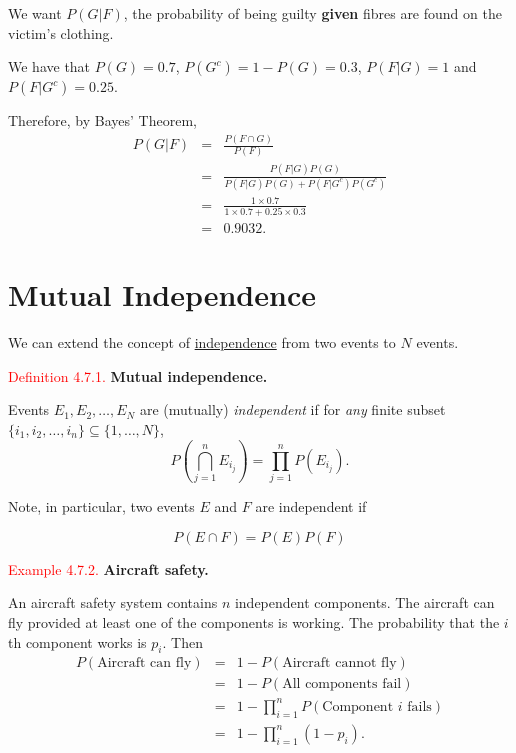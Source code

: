 \documentclass[
]{book}
\begin{document}
We want \(P(G|F)\), the probability of being guilty \textbf{given} fibres are found on the victim's clothing.

We have that \(P(G)=0.7\), \(P(G^c) = 1- P(G)=0.3\), \(P(F|G)=1\) and \(P(F|G^c)=0.25\).

Therefore, by Bayes' Theorem,\\

\begin{eqnarray*}
P(G|F) &=& \frac{P(F \cap G)}{P(F)}  \\ &=& \frac{P(F|G) P(G)}{P(F|G) P(G) + P(F|G^c) P(G^c)}  \\
&=& \frac{1 \times 0.7}{1 \times 0.7 + 0.25 \times 0.3}  \\
&=& 0.9032.
\end{eqnarray*}

\hfill\break

\hypertarget{prob:mutual}{%
\section{Mutual Independence}\label{prob:mutual}}

We can extend the concept of \protect\hyperlink{prob:def:independence}{independence} from two events to \(N\) events.

\leavevmode{}%
\textcolor{red}{Definition 4.7.1.}
{\textbf{Mutual independence.}}

Events \(E_1,E_2,\dots,E_N\) are (mutually) \emph{independent} if for \emph{any} finite subset \(\{i_1,i_2,\dots,i_n\} \subseteq \{1,\dots,N\}\),\\

\[P\left(\bigcap_{j=1}^nE_{i_j}\right)=\prod_{j=1}^nP(E_{i_j}).\]

\hfill\break

Note, in particular, two events \(E\) and \(F\) are independent if

\[P(E\cap F)=P(E)P(F)\]

\leavevmode{}%
\textcolor{red}{Example 4.7.2.}
{\textbf{Aircraft safety.}}

An aircraft safety system contains \(n\) independent components. The aircraft can fly provided at least one of the components is working. The probability
that the \(i\)th component works is \(p_{i}\). Then\\

\begin{eqnarray*}
P(\mbox{Aircraft can fly}) 
& = & 1 - P( \mbox{Aircraft cannot fly}) \\
& = & 1 - P( \mbox{All components fail}) \\
& = & 1 - \prod_{i=1}^{n} P( \mbox{Component $i$ fails} ) \\
& = & 1 - \prod_{i=1}^{n} (1 - p_{i}).
\end{eqnarray*}
\end{document}
